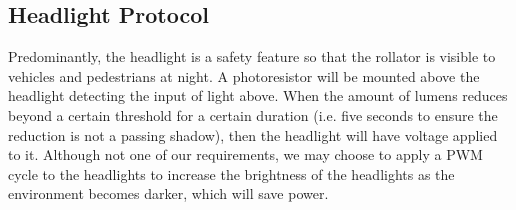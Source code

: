 \subsection{Headlight Protocol}
\noindent  Predominantly, the headlight is a safety feature so that the rollator is visible to vehicles and pedestrians at night. A photoresistor will be mounted above the headlight detecting the input of light above. When the amount of lumens reduces beyond a certain threshold for a certain duration (i.e. five seconds to ensure the reduction is not a passing shadow), then the headlight will have voltage applied to it. Although not one of our requirements, we may choose to apply a PWM cycle to the headlights to increase the brightness of the headlights as the environment becomes darker, which will save power.